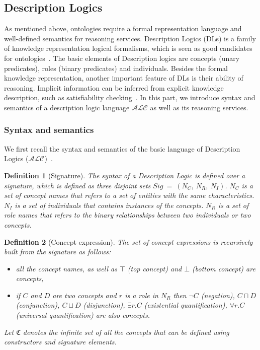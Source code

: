 \documentclass{article}
\newtheorem{mydef}{Definition}
\begin{document}
\subsection{Description Logics}
As mentioned above, ontologies require a formal representation language and well-defined semantics for reasoning services. 
Description Logics (DLs) is a family of knowledge representation logical formalisms, which is seen as good candidates for ontologies~\cite{horrocks1999description}.
The basic elements of Description logics are concepts (unary predicates), roles (binary predicates) and individuals.
Besides the formal knowledge representation, another important feature of DLs is their ability of reasoning.
Implicit information can be inferred from explicit knowledge description, such as satisfiability checking~\cite{baader2003description}. 
In this part, we introduce syntax and semantics of a description logic language $\mathcal{ALC}$ as well as its reasoning services.
\subsubsection{Syntax and semantics}
\label{subsec:synt}
We first recall the syntax and semantics of the basic language of Description Logics ($\mathcal{ALC}$)~\cite{baader2003description}.
\begin{mydef}[Signature]
 The syntax of a Description Logic is defined over a signature, which is defined as three disjoint sets $Sig~=~(N_C,~N_R,~N_I)$. $N_C$ is a set of concept names that refers to a set of entities
 with the same characteristics. $N_I$ is a set of individuals that contains instances of the concepts.  $N_R$ is a set of role names that refers to the binary relationships between 
 two individuals or two concepts.
\end{mydef}


\begin{mydef}[Concept expression]
 The set of concept expressions is recursively built from the signature as follows:
 \begin{itemize}
  \item all the concept names, as well as $\top$ (top concept) and $\bot$ (bottom concept) are concepts,
  \item if $C$ and $D$ are two concepts and $r$ is a role in $N_R$
  then $\neg C$ (negation), $ C\sqcap D$ (conjunction), $ C\sqcup D$ (disjunction), $ \exists r.C$ (existential quantification), $\forall r.C$ (universal quantification) are also concepts.
 \end{itemize}
 Let $\mathfrak{C}$ denotes the infinite set of all the concepts that can be defined using constructors and signature elements.
\end{mydef}
\end{document}
